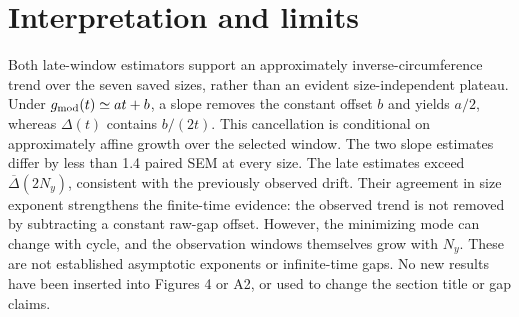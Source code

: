 \documentclass[aps,prb,onecolumn,nofootinbib,superscriptaddress]{revtex4-2}
\begin{document}
\section{Interpretation and limits}
Both late-window estimators support an approximately inverse-circumference trend over the seven saved sizes, rather than an evident size-independent plateau. Under $g_{\rm mod}(t)\simeq at+b$, a slope removes the constant offset $b$ and yields $a/2$, whereas $\Delta(t)$ contains $b/(2t)$. This cancellation is conditional on approximately affine growth over the selected window. The two slope estimates differ by less than 1.4 paired SEM at every size.
The late estimates exceed $\overline\Delta(2N_y)$, consistent with the previously observed drift. Their agreement in size exponent strengthens the finite-time evidence: the observed trend is not removed by subtracting a constant raw-gap offset. However, the minimizing mode can change with cycle, and the observation windows themselves grow with $N_y$. These are not established asymptotic exponents or infinite-time gaps. No new results have been inserted into Figures 4 or A2, or used to change the section title or gap claims.
\end{document}
